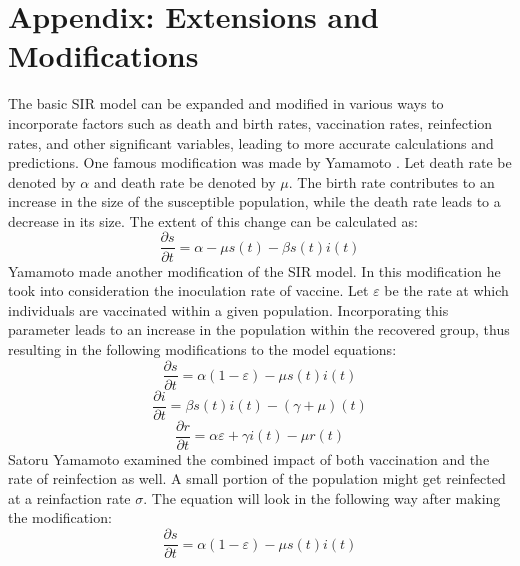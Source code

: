 \section{Appendix: Extensions and Modifications}\label{appendix-a}\thispagestyle{SectionFirstPage} %
\setcounter{figure}{0}
\setcounter{table}{0}
\hspace{\parindent}The basic SIR model can be expanded and modified in various ways to incorporate factors such as death and birth rates, vaccination rates, reinfection rates, and other significant variables, leading to more accurate calculations and predictions.
One famous modification was made by Yamamoto \cite{Satoru_Yamamoto}.
Let death rate be denoted by $\alpha$ and death rate be denoted by $\mu$.
The birth rate contributes to an increase in the size of the susceptible population, while the death rate leads to a decrease in its size.
The extent of this change can be calculated as:
\begin{equation*}
    \frac{\partial s}{\partial t} = \alpha - \mu s(t) - \beta s(t)i(t)
\end{equation*}
\hspace{\parindent}Yamamoto made another modification of the SIR model.
In this modification he took into consideration the inoculation rate of vaccine.
Let $\varepsilon$ be the rate at which individuals are vaccinated within a given population.
Incorporating this parameter leads to an increase in the population within the recovered group, thus resulting in the following modifications to the model equations:
\begin{equation*}
    \frac{\partial s}{\partial t} = \alpha(1 - \varepsilon) - \mu s(t)i(t)
\end{equation*}
\begin{equation*}
    \frac{\partial i}{\partial t} = \beta s(t)i(t) - (\gamma + \mu)(t)
\end{equation*}
\begin{equation*}
    \frac{\partial r}{\partial t} = \alpha\varepsilon + \gamma i(t) - \mu r(t)
\end{equation*}
\hspace{\parindent}Satoru Yamamoto examined the combined impact of both vaccination and the rate of reinfection as well.
A small portion of the population might get reinfected at a reinfaction rate $\sigma$.
The equation will look in the following way after making the modification:
\begin{equation*}
    \frac{\partial s}{\partial t} = \alpha(1 - \varepsilon) - \mu s(t)i(t)
\end{equation*}
